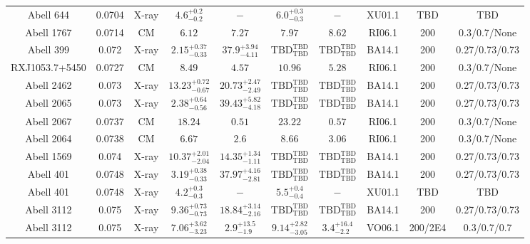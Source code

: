 \begin{table}
\begin{tabular}{cccccccccc}
Abell 644 & 0.0704 & X-ray & ${4.6}^{+0.2}_{-0.2}$ & ${-}^{}_{}$ & ${6.0}^{+0.3}_{-0.3}$ & ${-}^{}_{}$ & XU01.1 & TBD & TBD \\
Abell 1767 & 0.0714 & CM & ${6.12}^{}_{}$ & ${7.27}^{}_{}$ & ${7.97}^{}_{}$ & ${8.62}^{}_{}$ & RI06.1 & 200 & 0.3/0.7/None \\
Abell 399 & 0.072 & X-ray & ${2.15}^{+0.37}_{-0.33}$ & ${37.9}^{+3.94}_{-4.11}$ & ${\mathrm{TBD}}^{\mathrm{TBD}}_{\mathrm{TBD}}$ & ${\mathrm{TBD}}^{\mathrm{TBD}}_{\mathrm{TBD}}$ & BA14.1 & 200 & 0.27/0.73/0.73 \\
RXJ1053.7+5450 & 0.0727 & CM & ${8.49}^{}_{}$ & ${4.57}^{}_{}$ & ${10.96}^{}_{}$ & ${5.28}^{}_{}$ & RI06.1 & 200 & 0.3/0.7/None \\
Abell 2462 & 0.073 & X-ray & ${13.23}^{+0.72}_{-0.67}$ & ${20.73}^{+2.47}_{-2.49}$ & ${\mathrm{TBD}}^{\mathrm{TBD}}_{\mathrm{TBD}}$ & ${\mathrm{TBD}}^{\mathrm{TBD}}_{\mathrm{TBD}}$ & BA14.1 & 200 & 0.27/0.73/0.73 \\
Abell 2065 & 0.073 & X-ray & ${2.38}^{+0.64}_{-0.56}$ & ${39.43}^{+5.82}_{-4.18}$ & ${\mathrm{TBD}}^{\mathrm{TBD}}_{\mathrm{TBD}}$ & ${\mathrm{TBD}}^{\mathrm{TBD}}_{\mathrm{TBD}}$ & BA14.1 & 200 & 0.27/0.73/0.73 \\
Abell 2067 & 0.0737 & CM & ${18.24}^{}_{}$ & ${0.51}^{}_{}$ & ${23.22}^{}_{}$ & ${0.57}^{}_{}$ & RI06.1 & 200 & 0.3/0.7/None \\
Abell 2064 & 0.0738 & CM & ${6.67}^{}_{}$ & ${2.6}^{}_{}$ & ${8.66}^{}_{}$ & ${3.06}^{}_{}$ & RI06.1 & 200 & 0.3/0.7/None \\
Abell 1569 & 0.074 & X-ray & ${10.37}^{+2.01}_{-2.04}$ & ${14.35}^{+1.34}_{-1.11}$ & ${\mathrm{TBD}}^{\mathrm{TBD}}_{\mathrm{TBD}}$ & ${\mathrm{TBD}}^{\mathrm{TBD}}_{\mathrm{TBD}}$ & BA14.1 & 200 & 0.27/0.73/0.73 \\
Abell 401 & 0.0748 & X-ray & ${3.19}^{+0.38}_{-0.33}$ & ${37.97}^{+4.16}_{-2.81}$ & ${\mathrm{TBD}}^{\mathrm{TBD}}_{\mathrm{TBD}}$ & ${\mathrm{TBD}}^{\mathrm{TBD}}_{\mathrm{TBD}}$ & BA14.1 & 200 & 0.27/0.73/0.73 \\
Abell 401 & 0.0748 & X-ray & ${4.2}^{+0.3}_{-0.3}$ & ${-}^{}_{}$ & ${5.5}^{+0.4}_{-0.4}$ & ${-}^{}_{}$ & XU01.1 & TBD & TBD \\
Abell 3112 & 0.075 & X-ray & ${9.36}^{+0.73}_{-0.73}$ & ${18.84}^{+3.14}_{-2.16}$ & ${\mathrm{TBD}}^{\mathrm{TBD}}_{\mathrm{TBD}}$ & ${\mathrm{TBD}}^{\mathrm{TBD}}_{\mathrm{TBD}}$ & BA14.1 & 200 & 0.27/0.73/0.73 \\
Abell 3112 & 0.075 & X-ray & ${7.06}^{+3.62}_{-3.23}$ & ${2.9}^{+13.5}_{-1.9}$ & ${9.14}^{+2.82}_{-3.05}$ & ${3.4}^{+16.4}_{-2.2}$ & VO06.1 & 200/2E4 & 0.3/0.7/0.7 \\

\end{tabular}
\end{table}
